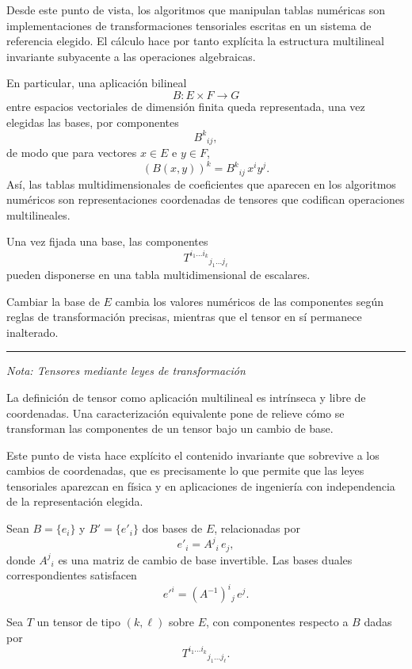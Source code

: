 Desde este punto de vista, los algoritmos que manipulan tablas numéricas son
implementaciones de transformaciones tensoriales escritas en un sistema de
referencia elegido. El cálculo hace por tanto explícita la estructura
multilineal invariante subyacente a las operaciones algebraicas.

\medskip

En particular, una aplicación bilineal
\[
B : E \times F \to G
\]
entre espacios vectoriales de dimensión finita queda representada, una vez
elegidas las bases, por componentes
\[
B^k{}_{ij},
\]
de modo que para vectores $x \in E$ e $y \in F$,
\[
(B(x,y))^k = B^k{}_{ij}\, x^i y^j.
\]
Así, las tablas multidimensionales de coeficientes que aparecen en los
algoritmos numéricos son representaciones coordenadas de tensores que codifican
operaciones multilineales.

\medskip

Una vez fijada una base, las componentes
\[
T^{i_1 \dots i_k}{}_{j_1 \dots j_\ell}
\]
pueden disponerse en una tabla multidimensional de escalares.

\medskip

Cambiar la base de $E$ cambia los valores numéricos de las componentes según
reglas de transformación precisas, mientras que el tensor en sí permanece
inalterado.

\bigskip
\hrule
\medskip

\textit{Nota: Tensores mediante leyes de transformación}

La definición de tensor como aplicación multilineal es intrínseca y libre de
coordenadas. Una caracterización equivalente pone de relieve cómo se
transforman las componentes de un tensor bajo un cambio de base.

\medskip

Este punto de vista hace explícito el contenido invariante que sobrevive a los
cambios de coordenadas, que es precisamente lo que permite que las leyes
tensoriales aparezcan en física y en aplicaciones de ingeniería con
independencia de la representación elegida.

\medskip

Sean $B = \{e_i\}$ y $B' = \{e'_i\}$ dos bases de $E$, relacionadas por
\[
e'_i = A^j{}_i \, e_j,
\]
donde $A^j{}_i$ es una matriz de cambio de base invertible.
Las bases duales correspondientes satisfacen
\[
e'^i = (A^{-1})^i{}_j \, e^j.
\]

\medskip

Sea $T$ un tensor de tipo $(k,\ell)$ sobre $E$, con componentes respecto a
$B$ dadas por
\[
T^{i_1 \dots i_k}{}_{j_1 \dots j_\ell}.
\]

